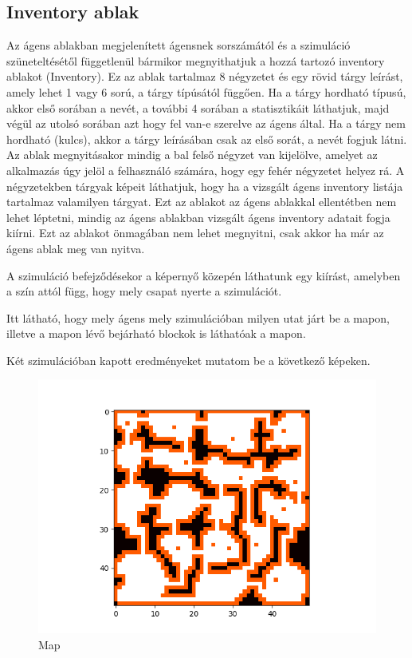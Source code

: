 \subsection{Inventory ablak}
Az ágens ablakban megjelenített ágensnek sorszámától és a szimuláció szüneteltésétől függetlenül bármikor megnyithatjuk a hozzá tartozó inventory ablakot (Inventory).
Ez az ablak tartalmaz 8 négyzetet és egy rövid tárgy leírást, amely lehet 1 vagy 6 sorú, a tárgy típúsától függően. Ha a tárgy hordható típusú, akkor első sorában a nevét, 
a további 4 sorában a statisztikáit láthatjuk, majd végül az utolsó sorában azt hogy fel van-e szerelve az ágens által. Ha a tárgy nem hordható (kulcs), 
akkor a tárgy leírásában csak az első sorát, a nevét fogjuk látni.
Az ablak megnyitásakor mindig a bal felső négyzet van kijelölve, amelyet az alkalmazás úgy jelöl a felhasználó számára, hogy egy fehér négyzetet helyez rá.
A négyzetekben tárgyak képeit láthatjuk, hogy ha a vizsgált ágens inventory listája tartalmaz valamilyen tárgyat.
Ezt az ablakot az ágens ablakkal ellentétben nem lehet léptetni, mindig az ágens ablakban vizsgált ágens inventory adatait fogja kiírni.
Ezt az ablakot önmagában nem lehet megnyitni, csak akkor ha már az ágens ablak meg van nyitva.


A szimuláció befejződésekor a képernyő közepén láthatunk egy kiírást, amelyben a szín attól függ, hogy mely csapat nyerte a szimulációt.


Itt látható, hogy mely ágens mely szimulációban milyen utat járt be a mapon, illetve a mapon lévő bejárható blockok is láthatóak a mapon.

Két szimulációban kapott eredményeket mutatom be a következő képeken.

\begin{figure}[!ht]
	\centering
	\includegraphics[scale=0.70]{images/map.png}
	\caption{Map}
	\label{fig:map}
\end{figure}

